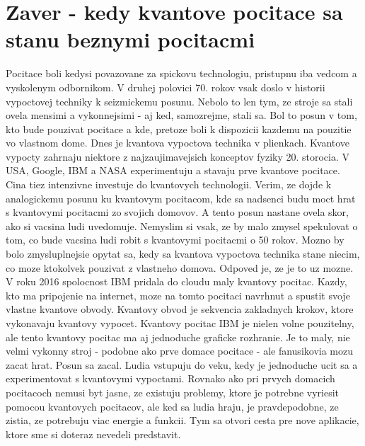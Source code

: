 \documentclass[year=2021]{article}
\begin{document}
\section{Zaver - kedy kvantove pocitace sa stanu beznymi pocitacmi}
Pocitace boli kedysi povazovane za spickovu technologiu, pristupnu iba vedcom a vyskolenym odbornikom. V druhej polovici 70. rokov vsak doslo v historii vypoctovej techniky k seizmickemu posunu. Nebolo to len tym, ze stroje sa stali ovela mensimi a vykonnejsimi - aj ked, samozrejme, stali sa. Bol to posun v tom, kto bude pouzivat pocitace a kde, pretoze boli k dispozicii kazdemu na pouzitie vo vlastnom dome.
\bigbreak
Dnes je kvantova vypoctova technika v plienkach. Kvantove vypocty zahrnaju niektore z najzaujimavejsich konceptov fyziky 20. storocia. V USA, Google, IBM a NASA experimentuju a stavaju prve kvantove pocitace. Cina tiez intenzivne investuje do kvantovych technologii.
\bigbreak
Verim, ze dojde k analogickemu posunu ku kvantovym pocitacom, kde sa nadsenci budu moct hrat s kvantovymi pocitacmi zo svojich domovov. A tento posun nastane ovela skor, ako si vacsina ludi uvedomuje.
\bigbreak
Nemyslim si vsak, ze by malo zmysel spekulovat o tom, co bude vacsina ludi robit s kvantovymi pocitacmi o 50 rokov. Mozno by bolo zmysluplnejsie opytat sa, kedy sa kvantova vypoctova technika stane niecim, co moze ktokolvek pouzivat z vlastneho domova.
\bigbreak
Odpoved je, ze je to uz mozne. V roku 2016 spolocnost IBM pridala do cloudu maly kvantovy pocitac. Kazdy, kto ma pripojenie na internet, moze na tomto pocitaci navrhnut a spustit svoje vlastne kvantove obvody. Kvantovy obvod je sekvencia zakladnych krokov, ktore vykonavaju kvantovy vypocet.
\bigbreak
Kvantovy pocitac IBM je nielen volne pouzitelny, ale tento kvantovy pocitac ma aj jednoduche graficke rozhranie. Je to maly, nie velmi vykonny stroj - podobne ako prve domace pocitace - ale fanusikovia mozu zacat hrat. Posun sa zacal.
\bigbreak
Ludia vstupuju do veku, kedy je jednoduche ucit sa a experimentovat s kvantovymi vypoctami. Rovnako ako pri prvych domacich pocitacoch nemusi byt jasne, ze existuju problemy, ktore je potrebne vyriesit pomocou kvantovych pocitacov, ale ked sa ludia hraju, je pravdepodobne, ze zistia, ze potrebuju viac energie a funkcii. Tym sa otvori cesta pre nove aplikacie, ktore sme si doteraz nevedeli predstavit.
\end{document}
